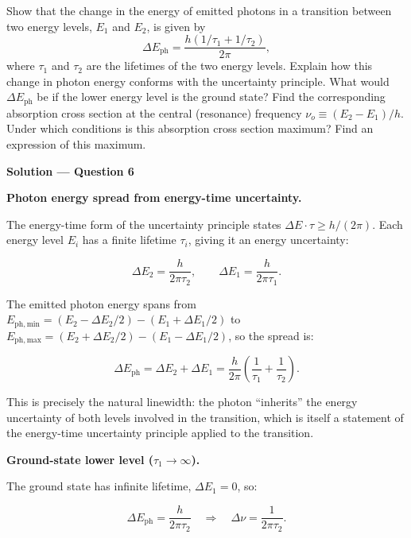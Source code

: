 \begin{question}[Question 6]Show that the change in the energy of emitted photons in a transition
between two energy levels, $E_{1}$ and $E_{2}$, is given by
\begin{equation*}
  \Delta E_{\mathrm{ph}}=\frac{h(1/\tau_{1}+1/\tau_{2})}{2\pi},
\end{equation*}
where $\tau_{1}$ and $\tau_{2}$ are the lifetimes of the two energy levels. Explain how this
change in photon energy conforms with the uncertainty principle. What would $\Delta E_{\mathrm{ph}}$
be if the lower energy level is the ground state? Find the corresponding absorption cross section
at the central (resonance) frequency $\nu_{o}\equiv(E_{2}-E_{1})/h$. Under which conditions is
this absorption cross section maximum? Find an expression of this maximum.
\end{question}

\textbf{\large Solution --- Question 6}

\textbf{Photon energy spread from energy-time uncertainty.}

The energy-time form of the uncertainty principle states $\Delta E\cdot\tau \geq h/(2\pi)$. Each energy level $E_i$ has a finite lifetime $\tau_i$, giving it an energy uncertainty:

\begin{equation*}
  \Delta E_2 = \frac{h}{2\pi\tau_2}, \qquad \Delta E_1 = \frac{h}{2\pi\tau_1}.
\end{equation*}

The emitted photon energy spans from $E_{\mathrm{ph,min}} = (E_2 - \Delta E_2/2)-(E_1+\Delta E_1/2)$ to $E_{\mathrm{ph,max}} = (E_2+\Delta E_2/2)-(E_1-\Delta E_1/2)$, so the spread is:

\begin{equation*}
  \boxed{\Delta E_{\mathrm{ph}} = \Delta E_2 + \Delta E_1 = \frac{h}{2\pi}\!\left(\frac{1}{\tau_1}+\frac{1}{\tau_2}\right).}
\end{equation*}

This is precisely the natural linewidth: the photon ``inherits'' the energy uncertainty of both levels involved in the transition, which is itself a statement of the energy-time uncertainty principle applied to the transition.

\textbf{Ground-state lower level ($\tau_1 \to \infty$).}

The ground state has infinite lifetime, $\Delta E_1 = 0$, so:

\begin{equation*}
  \Delta E_{\mathrm{ph}} = \frac{h}{2\pi\tau_2} \quad\Longrightarrow\quad \Delta\nu = \frac{1}{2\pi\tau_2}.
\end{equation*}

